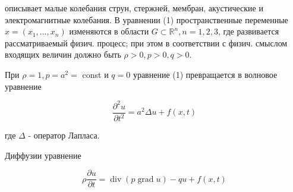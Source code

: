\documentclass[10pt]{article}
\begin{document}
описывает малые колебания струн, стержней, мембран, акустические и электромагнитные колебания. В уравнении (1) пространственные переменные $x=\left(x_{1}, \ldots, x_{n}\right)$ изменяются в области $G \subset \mathbb{R}^{n}, n=1,2,3$, где развивается рассматриваемый физич. процесс; при этом в соответствии с физич. смыслом входящих величин должно быть $\rho>0, p>0, q>0$.



При $\rho=1, p=a^{2}=$ const и $q=0$ уравнение (1) превращается в волновое уравнение



\[

\frac{\partial^{2} u}{\partial t^{2}}=a^{2} \Delta u+f(x, t)

\]



где $\Delta$ - оператор Лапласа.



Диффузии уравнение



\[

\rho \frac{\partial u}{\partial t}=\operatorname{div}(p \operatorname{grad} u)-q u+f(x, t)

\]
\end{document}

